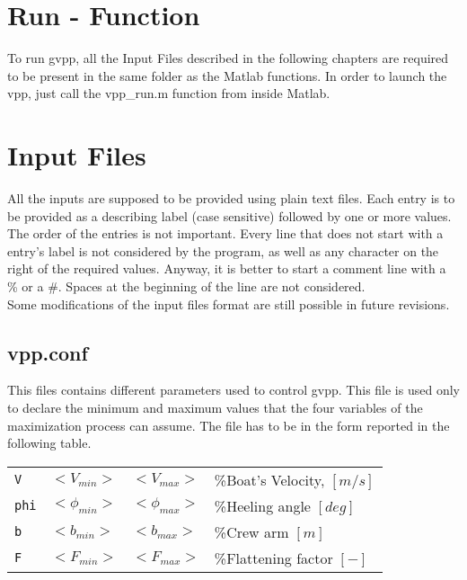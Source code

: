 \documentclass[a4paper,openany]{memoir}
\begin{document}
\chapter{Run - Function }
\label{chapter_RunFunction}

To run gvpp, all the Input Files described in the following chapters are required to be present in the same folder as the Matlab functions. In order to launch the vpp, just call the vpp\_run.m function from inside Matlab.

\chapter{Input Files}
\label{chapter_InputFiles}
All the inputs are supposed to be provided using plain text files. Each entry is to be provided as a describing label (case sensitive) followed by one or more values. The order of the entries is not important. Every line that does not start with a entry's label is not considered by the program, as well as any character on the right of the required values. Anyway, it is better to start a comment line with a \% or a \#. Spaces at the beginning of the line are not considered.\\
Some modifications of the input files format are still possible in future revisions.

\section{vpp.conf}
This files contains different parameters used to control gvpp. This file is used only to declare the minimum and maximum values that the four variables of the maximization process can assume. The file has to be in the form reported in the following table.
\begin{center}
  \begin{tabular}{l l l l}
    \texttt{V}		&$<V_{min}>$ 		& ${<V_{max}>}$ 	&\%Boat's Velocity, $[m/s]$\\
    \texttt{phi}		&${<\phi_{min}>}$ 	& ${<\phi_{max}>}$ 	&\%Heeling angle $[deg]$\\
    \texttt{b}		&${<b_{min}>}$	 	& ${<b_{max}>}$ 	&\%Crew arm $[m]$\\
    \texttt{F}		&${<F_{min}>}$	 	& ${<F_{max}>}$ 	&\%Flattening factor $[-]$\\
  \end{tabular}
\end{center}
\end{document}
